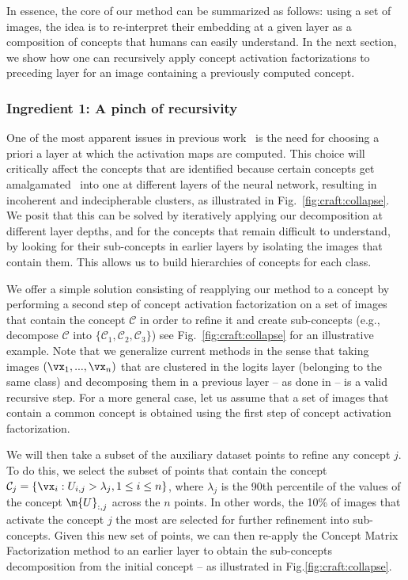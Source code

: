 In essence, the core of our method can be summarized as follows: using a set of images, the idea is to re-interpret their embedding at a given layer as a composition of concepts that humans can easily understand. 
In the next section, we show how one can recursively apply concept activation factorizations to preceding layer for an image containing a previously computed concept.



\subsubsection{Ingredient 1: A pinch of recursivity}\label{subsec:rec}



One of the most apparent issues in previous work~\cite{ghorbani2019towards,zhang2021invertible} is the need for choosing a priori a layer at which the activation maps are computed. This choice will critically affect the concepts that are identified  because certain concepts get amalgamated~\cite{paypan2020collapse} into one at different layers of the neural network, resulting in incoherent and indecipherable clusters, as illustrated in Fig.~\ref{fig:craft:collapse}. We posit that this can be solved by iteratively applying our decomposition at different layer depths, and for the concepts that remain difficult to understand, by looking for their sub-concepts in earlier layers by isolating the images that contain them. This allows us to build hierarchies of concepts for each class. 


We offer a simple solution consisting of reapplying our method to a concept by performing a second step of concept activation factorization on a set of images that contain the concept $\mathcal{C}$ in order to refine it and create sub-concepts (e.g., decompose $\mathcal{C}$ into $\{ \mathcal{C}_1,\mathcal{C}_2,\mathcal{C}_3 \}$) see Fig.~\ref{fig:craft:collapse} for an illustrative example. 
Note that we generalize current methods in the sense that taking images $(\vx_1, ..., \vx_n)$ that are clustered in the logits layer (belonging to the same class) and decomposing them in a previous layer -- as done in \cite{ghorbani2019towards, zhang2021invertible} -- is a valid recursive step.
For a more general case, let us assume that a set of images that contain a common concept is obtained using the first step of concept activation factorization. 

We will then take a subset of the auxiliary dataset points to refine any concept $j$. To do this, we select the subset of points that contain the concept $\mathcal{C}_j = \{\vx_i : U_{i,j} > \lambda_j, 1 \leq i \leq n \}$, where $\lambda_j$ is the 90th percentile of the values of the concept $\m{U}_{:,j}$ across the $n$ points. In other words, the 10\% of images that activate the concept $j$ the most are selected for further refinement into sub-concepts.
Given this new set of points, we can then re-apply the Concept Matrix Factorization method to an earlier layer to obtain the sub-concepts decomposition from the initial concept -- as illustrated in Fig.\ref{fig:craft:collapse}.



